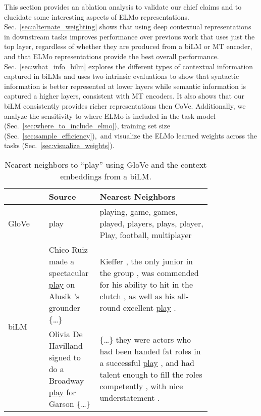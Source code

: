 \documentclass[11pt,a4paper]{article}
\newcommand{\ELMO}{ELMo}
\begin{document}
This section provides an ablation analysis to validate our chief claims and to elucidate some interesting aspects of \ELMO{} representations.
Sec.~\ref{sec:alternate_weighting} shows that using deep contextual representations in downstream tasks improves performance over previous work that uses just the top layer, regardless of whether they are produced from a biLM or MT encoder, and that \ELMO{} representations provide the best overall performance. 
Sec.~\ref{sec:what_info_bilm} explores the different types of contextual information captured in biLMs and uses two intrinsic evaluations to show that syntactic information is better represented at lower layers while semantic information is captured a higher layers, consistent with MT encoders.
It also shows that our biLM consistently provides richer representations then CoVe.
Additionally, we analyze the sensitivity to where \ELMO{} is included in the task model (Sec.~\ref{sec:where_to_include_elmo}), training set size (Sec.~\ref{sec:sample_efficiency}),~and visualize the \ELMO{} learned weights across the tasks (Sec.~\ref{sec:visualize_weights}). 


\begin{table*}   \centering
\begin{tabular}{lm{0.25\linewidth}|m{0.55\linewidth}} \\
 & Source & Nearest Neighbors \\ \hline \hline
GloVe & play & playing, game, games, played, players, plays, player, Play, football, multiplayer \\ \hline
\multirow{2}{*}[-3ex]{biLM} & Chico Ruiz made a spectacular \underline{play} on Alusik 's grounder \{\ldots\}
& Kieffer , the only junior in the group , was commended for his ability to hit in the clutch , as well as his all-round excellent \underline{play} . \\ \cline{2-3}
& Olivia De Havilland signed to do a Broadway \underline{play} for Garson \{\ldots\}
& \{\ldots\} they were actors who had been handed fat roles in a successful \underline{play} , and had talent enough to fill the roles competently , with nice understatement . \\ 
\end{tabular}
\caption{Nearest neighbors to ``play'' using GloVe and the context embeddings from a biLM.}
\label{table:nearest_neighbors}
\end{table*}  
\end{document}
